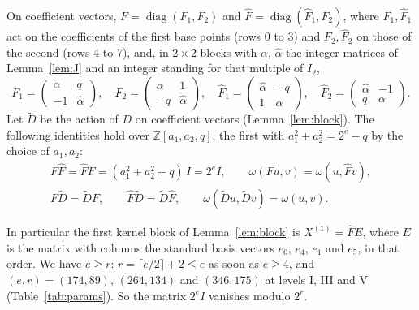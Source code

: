 \documentclass[version=preprint]{iacrcc}
\begin{document}
    \begin{lemma}
        \label{lem:kanimat}
        On coefficient vectors, $F = \operatorname{diag}(F_1, F_2)$ and $\widehat F
        = \operatorname{diag}(\widehat F_1, \widehat F_2)$, where $F_1, \widehat F_1$
        act on the coefficients of the first base points (rows 0 to 3) and $F_2,
        \widehat F_2$ on those of the second (rows 4 to 7), and, in $2 \times 2$
        blocks with $\alpha$, $\widehat\alpha$ the integer matrices of
        Lemma~\ref{lem:J} and an integer standing for that multiple of $I_2$,
        \[
        F_1 = \begin{pmatrix} \alpha & q \\ -1 & \widehat\alpha \end{pmatrix}, \quad
        F_2 = \begin{pmatrix} \alpha & 1 \\ -q & \widehat\alpha \end{pmatrix}, \quad
        \widehat F_1 = \begin{pmatrix} \widehat\alpha & -q \\ 1 & \alpha
        \end{pmatrix}, \quad
        \widehat F_2 = \begin{pmatrix} \widehat\alpha & -1 \\ q & \alpha
        \end{pmatrix}.
        \]
        Let $\tilde D$ be the action of $D$ on coefficient vectors
        (Lemma~\ref{lem:block}). The following identities hold over $\mathbb
        Z[a_1, a_2, q]$, the first with $a_1^2 + a_2^2 = 2^e - q$ by the choice of
        $a_1, a_2$:
        \begin{equation}
            \label{eq:kani-matrices}
            \begin{gathered}
                F\widehat F = \widehat F F = (a_1^2 + a_2^2 + q)\, I = 2^e I, \qquad
                \omega(F u, v) = \omega(u, \widehat F v), \\
                F \tilde D = \tilde D F, \qquad \widehat F \tilde D = \tilde D \widehat F,
                \qquad \omega(\tilde D u, \tilde D v) = \omega(u, v).
            \end{gathered}
        \end{equation}
    \end{lemma}


    In particular the first kernel block of Lemma~\ref{lem:block} is $X^{(1)}
    = \widehat F E$, where $E$ is the matrix with columns the standard basis
    vectors $e_0$, $e_4$, $e_1$ and $e_5$, in that order. We have $e \ge r$: $r
    = \lceil e/2 \rceil + 2 \le e$ as soon as $e \ge 4$, and $(e, r) = (174, 89)$,
    $(264, 134)$ and $(346, 175)$ at levels I, III and V
    (Table~\ref{tab:params}). So the matrix $2^e I$ vanishes modulo $2^r$.
\end{document}
